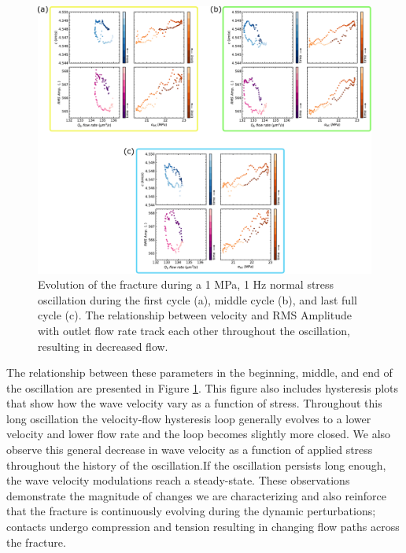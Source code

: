 \documentclass[letterpaper,10pt]{article}
\begin{document}
\clearpage


\begin{figure}[ht]
	\centering
	\includegraphics[width=0.9\columnwidth]{bowtie_p4975_run3b_01Hz_v3_portrait.pdf}
	\caption[]{Evolution of the fracture during a 1 MPa, 1 Hz normal stress oscillation during the first cycle (a), middle cycle (b), and last full cycle (c). The relationship between velocity and RMS Amplitude with outlet flow rate track each other throughout the oscillation, resulting in decreased flow.} %
	\label{fig:bowties}
\end{figure}

The relationship between these parameters in the beginning, middle, and end of the oscillation are presented in Figure \ref{fig:bowties}. This figure also includes hysteresis plots that show how the wave velocity vary as a function of stress. Throughout this long oscillation the velocity-flow hysteresis loop generally evolves to a lower velocity and lower flow rate and the loop becomes slightly more closed. We also observe this general decrease in wave velocity as a function of applied stress throughout the history of the oscillation.If the oscillation persists long enough, the wave velocity modulations reach a steady-state. These observations demonstrate the magnitude of changes we are characterizing and also reinforce that the fracture is continuously evolving during the dynamic perturbations; contacts undergo compression and tension resulting in changing flow paths across the fracture.
\end{document}
